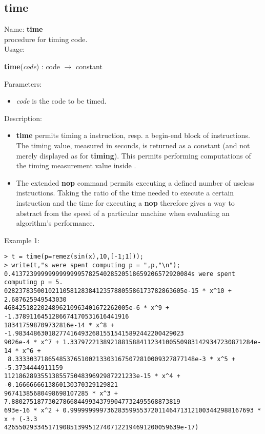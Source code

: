 \subsection{time}
\label{labtime}
\noindent Name: \textbf{time}\\
procedure for timing \sollya code.\\
\noindent Usage: 
\begin{center}
\textbf{time}(\emph{code}) : \textsf{code} $\rightarrow$ \textsf{constant}\\
\end{center}
Parameters: 
\begin{itemize}
\item \emph{code} is the code to be timed.
\end{itemize}
\noindent Description: \begin{itemize}

\item \textbf{time} permits timing a \sollya instruction, resp. a begin-end block
   of \sollya instructions. The timing value, measured in seconds, is returned
   as a \sollya constant (and not merely displayed as for \textbf{timing}). This 
   permits performing computations of the timing measurement value inside \sollya.

\item The extended \textbf{nop} command permits executing a defined number of
   useless instructions. Taking the ratio of the time needed to execute a
   certain \sollya instruction and the time for executing a \textbf{nop}
   therefore gives a way to abstract from the speed of a particular 
   machine when evaluating an algorithm's performance.
\end{itemize}
\noindent Example 1: 
\begin{center}\begin{minipage}{15cm}\begin{Verbatim}[frame=single]
> t = time(p=remez(sin(x),10,[-1;1]));
> write(t,"s were spent computing p = ",p,"\n");
0.4137239999999999999578254028520518659206572920084s were spent computing p = 5.
0282378350010211058128384123578805586173782863605e-15 * x^10 + 2.687625949543030
4684251822024896210963401672262005e-6 * x^9 + -1.3789116451286674170531616441916
183417598709732816e-14 * x^8 + -1.9834486301827741649326815515415892442200429023
9026e-4 * x^7 + 1.33797221389218815884112341005509831429347230871284e-14 * x^6 +
 8.3333037186548537651002133031675072810009327877148e-3 * x^5 + -5.3734444911159
112186289355138557504839692987221233e-15 * x^4 + -0.1666666613860130370329129821
96741385680498698107285 * x^3 + 7.8802751877302786684499343799047732495568873819
693e-16 * x^2 + 0.99999999973628359955372011464713121003442988167693 * x + (-3.3
426550293345171908513995127407122194691200059639e-17)
\end{Verbatim}
\end{minipage}\end{center}
